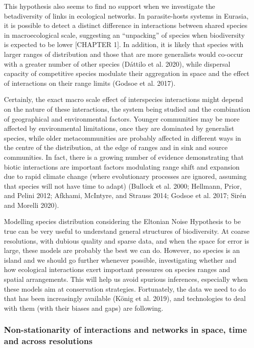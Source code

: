 \documentclass[12pt]{article}
\begin{document}
This hypothesis also seems to find no support when we investigate the
betadiversity of links in ecological networks. In parasite-hosts systems
in Eurasia, it is possible to detect a distinct difference in
interactions between shared species in macroecological scale, suggesting
an ``unpacking'' of species when biodiversity is expected to be lower
{[}CHAPTER 1{]}. In addition, it is likely that species with larger
ranges of distribution and those that are more generalists would
co-occur with a greater number of other species (Dáttilo et al. 2020),
while dispersal capacity of competitive species modulate their
aggregation in space and the effect of interactions on their range
limits (Godsoe et al. 2017).

Certainly, the exact macro scale effect of interspecies interactions
might depend on the nature of these interactions, the system being
studied and the combination of geographical and environmental factors.
Younger communities may be more affected by environmental limitations,
once they are dominated by generalist species, while older
metacommunities are probably affected in different ways in the centre of
the distribution, at the edge of ranges and in sink and source
communities. In fact, there is a growing number of evidence
demonstrating that biotic interactions are important factors modulating
range shift and expansion due to rapid climate change (where
evolutionary processes are ignored, assuming that species will not have
time to adapt) (Bullock et al. 2000; Hellmann, Prior, and Pelini 2012;
Afkhami, McIntyre, and Strauss 2014; Godsoe et al. 2017; Sirén and
Morelli 2020).

Modelling species distribution considering the Eltonian Noise Hypothesis
to be true can be very useful to understand general structures of
biodiversity. At coarse resolutions, with dubious quality and sparse
data, and when the space for error is large, these models are probably
the best we can do. However, no species is an island and we should go
further whenever possible, investigating whether and how ecological
interactions exert important pressures on species ranges and spatial
arrangements. This will help us avoid spurious inferences, especially
when these models aim at conservation strategies. Fortunately, the data
we need to do that has been increasingly available (König et al. 2019),
and technologies to deal with them (with their biases and gaps) are
following.

\hypertarget{non-stationarity-of-interactions-and-networks-in-space-time-and-across-resolutions}{%
\subsubsection{Non-stationarity of interactions and networks in space,
time and across
resolutions}\label{non-stationarity-of-interactions-and-networks-in-space-time-and-across-resolutions}}
\end{document}
